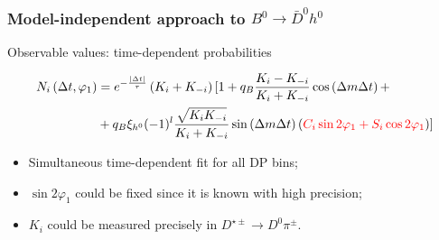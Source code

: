 \documentclass[10 pt,compress,mathserif]{beamer}
\newcommand{\bdh}{\ensuremath{B^0\to \bar D^0h^0}\xspace}
\begin{document}
\begin{frame}
 \frametitle{Model-independent approach to \bdh}
 Observable values: time-dependent probabilities

 \begin{equation}
 \begin{split}
  N_i\left(\Delta t,\varphi_1\right) &= e^{-\frac{\left|\Delta t\right|}{\tau}}\left(K_{i}+K_{-i}\right)[ 1 + q_{B}\frac{K_{i}-K_{-i}}{K_{i}+K_{-i}}\cos\left(\Delta m\Delta t\right)+\\
  &+q_{B}\xi_{h^0}(-1)^l\frac{\sqrt{K_iK_{-i}}}{K_{i}+K_{-i}}\sin\left(\Delta m\Delta t\right)\left(\textcolor{red}{C_i\sin2\varphi_1+S_i\cos2\varphi_1}\right)]
 \end{split}
 \end{equation}
 
 \begin{itemize}
  \item Simultaneous time-dependent fit for all DP bins;
  \item $\sin2\varphi_1$ could be fixed since it is known with high precision;
  \item $K_i$ could be measured precisely in $D^{\star\pm}\to D^0\pi^{\pm}$.
 \end{itemize}
\end{frame}
\end{document}
